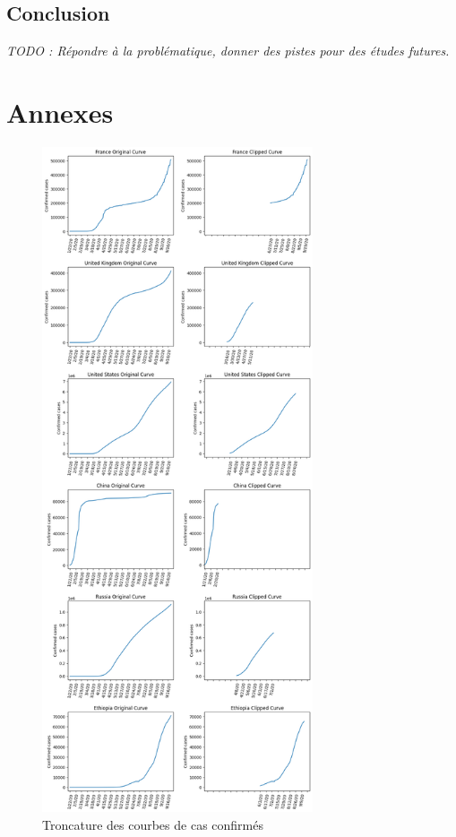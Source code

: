 \documentclass[12pt]{iEEEtran}
\begin{document}
\subsection{Conclusion}
\textit{TODO : Répondre à la problématique, donner des pistes pour des études futures.}




\newpage

\section{Annexes}
\begin{figure}[h]
    \centering
    \includegraphics[width=8cm]{img/clip_full.png}
    \caption{Troncature des courbes de cas confirmés}
    \label{fig:clip_full}
\end{figure}
\end{document}
